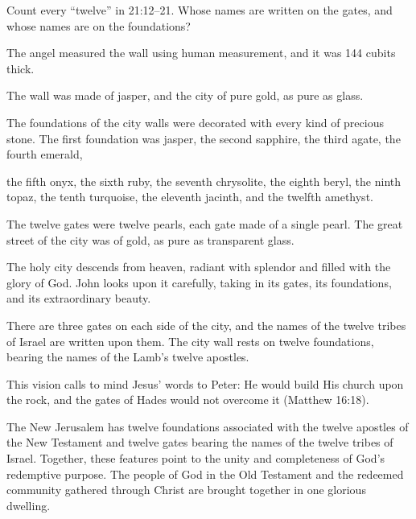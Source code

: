 \begin{ScriptureBox2}{Count every ``twelve'' in 21:12--21. Whose names are written on the gates, and whose names are on the foundations?}
\item[21:17] The angel measured the wall using human measurement, and it was 144 cubits thick.

\item[21:18] The wall was made of jasper, and the city of pure gold, as pure as glass.

\item[21:19] The foundations of the city walls were decorated with every kind of precious stone. The first foundation was jasper, the second sapphire, the third agate, the fourth emerald,

\item[21:20] the fifth onyx, the sixth ruby, the seventh chrysolite, the eighth beryl, the ninth topaz, the tenth turquoise, the eleventh jacinth, and the twelfth amethyst.

\item[21:21] The twelve gates were twelve pearls, each gate made of a single pearl. The great street of the city was of gold, as pure as transparent glass.

\end{ScriptureBox2}

The holy city descends from heaven, radiant with splendor and filled with the glory of God. John looks upon it carefully, taking in its gates, its foundations, and its extraordinary beauty.

There are three gates on each side of the city, and the names of the twelve tribes of Israel are written upon them. The city wall rests on twelve foundations, bearing the names of the Lamb's twelve apostles.

This vision calls to mind Jesus' words to Peter: He would build His church upon the rock, and the gates of Hades would not overcome it (Matthew 16:18).

The New Jerusalem has twelve foundations associated with the twelve apostles of the New Testament and twelve gates bearing the names of the twelve tribes of Israel. Together, these features point to the unity and completeness of God's redemptive purpose. The people of God in the Old Testament and the redeemed community gathered through Christ are brought together in one glorious dwelling.

